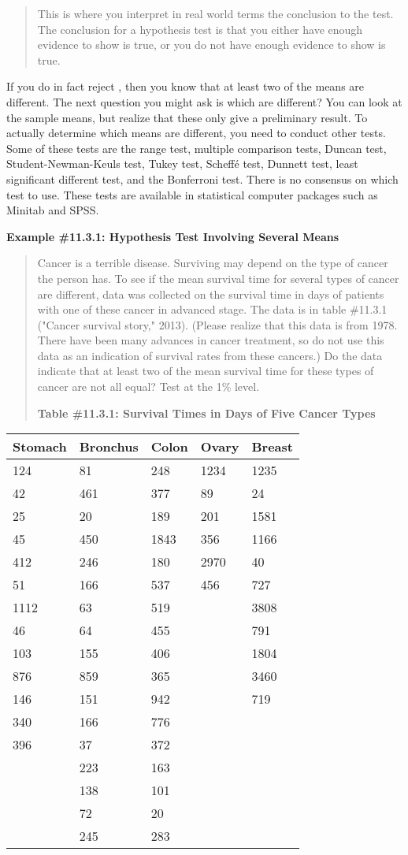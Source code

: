 \documentclass[]{book}
\begin{document}
\begin{quote}
This is where you interpret in real world terms the conclusion to the test. The conclusion for a hypothesis test is that you either have enough evidence to show is true, or you do not have enough evidence to show is true.
\end{quote}

If you do in fact reject , then you know that at least two of the means are different. The next question you might ask is which are different? You can look at the sample means, but realize that these only give a preliminary result. To actually determine which means are different, you need to conduct other tests. Some of these tests are the range test, multiple comparison tests, Duncan test, Student-Newman-Keuls test, Tukey test, Scheffé test, Dunnett test, least significant different test, and the Bonferroni test. There is no consensus on which test to use. These tests are available in statistical computer packages such as Minitab and SPSS.

\textbf{Example \#11.3.1: Hypothesis Test Involving Several Means}

\begin{quote}
Cancer is a terrible disease. Surviving may depend on the type of cancer the person has. To see if the mean survival time for several types of cancer are different, data was collected on the survival time in days of patients with one of these cancer in advanced stage. The data is in table \#11.3.1 ("Cancer survival story," 2013). (Please realize that this data is from 1978. There have been many advances in cancer treatment, so do not use this data as an indication of survival rates from these cancers.) Do the data indicate that at least two of the mean survival time for these types of cancer are not all equal? Test at the 1\% level.

\textbf{Table \#11.3.1: Survival Times in Days of Five Cancer Types}
\end{quote}

\begin{longtable}[]{@{}lllll@{}}
\toprule
Stomach & Bronchus & Colon & Ovary & Breast\tabularnewline
\midrule
\endhead
124 & 81 & 248 & 1234 & 1235\tabularnewline
42 & 461 & 377 & 89 & 24\tabularnewline
25 & 20 & 189 & 201 & 1581\tabularnewline
45 & 450 & 1843 & 356 & 1166\tabularnewline
412 & 246 & 180 & 2970 & 40\tabularnewline
51 & 166 & 537 & 456 & 727\tabularnewline
1112 & 63 & 519 & & 3808\tabularnewline
46 & 64 & 455 & & 791\tabularnewline
103 & 155 & 406 & & 1804\tabularnewline
876 & 859 & 365 & & 3460\tabularnewline
146 & 151 & 942 & & 719\tabularnewline
340 & 166 & 776 & &\tabularnewline
396 & 37 & 372 & &\tabularnewline
& 223 & 163 & &\tabularnewline
& 138 & 101 & &\tabularnewline
& 72 & 20 & &\tabularnewline
& 245 & 283 & &\tabularnewline
\bottomrule
\end{longtable}
\end{document}
